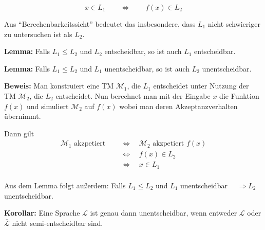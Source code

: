 \documentclass{scrartcl}%
\begin{document}
    \begin{equation*}
        x \in L_1 \qquad \Leftrightarrow \qquad f(x) \in L_2
    \end{equation*}

    Aus "`Berechenbarkeitssicht"' bedeutet das insbesondere, dass $L_1$ nicht schwieriger zu untersuchen ist als $L_2$.

    \vspace*{0.3cm}
    \textbf{\textsf{Lemma:}} Falls $L_1 \leq L_2$ und $L_2$ entscheidbar, so ist auch $L_1$ entscheidbar.

    \vspace*{0.3cm}
    \textbf{\textsf{Lemma:}} Falls $L_1 \leq L_2$ und $L_1$ unentscheidbar, so ist auch $L_2$ unentscheidbar.

    \vspace*{0.3cm}
    \textbf{\textsf{Beweis:}} Man konstruiert eine TM $\mathcal{M}_1$,
    die $L_1$ entscheidet unter Nutzung der TM $\mathcal{M}_2$, die $L_2$ entscheidet.
    Nun berechnet man mit der Eingabe $x$ die Funktion $f(x)$ und simuliert $\mathcal{M}_2$ auf $f(x)$ wobei man deren Akzeptanzverhalten übernimmt.

    \vspace*{0.3cm}
    Dann gilt
    \begin{align*}
        \mathcal{M}_1 \text{ akzpetiert } & \quad \Leftrightarrow \quad \mathcal{M}_2 \text{ akzpetiert } f(x) \\
        & \quad \Leftrightarrow \quad f(x) \in L_2 \\
        & \quad \Leftrightarrow \quad x \in L_1 \\
    \end{align*}\proofend

    \vspace*{0.3cm}
    Aus dem Lemma folgt außerdem: Falls $L_1 \leq L_2$ und $L_1$ unentscheidbar $\quad \Rightarrow L_2$ unentscheidbar.

    \vspace*{0.3cm}
    \textbf{\textsf{Korollar:}}
    Eine Sprache $\mathcal{L}$ ist genau dann unentscheidbar,
    wenn entweder $\mathcal{L}$ oder $\overline{\mathcal{L}}$ nicht semi-entscheidbar sind.
\end{document}
